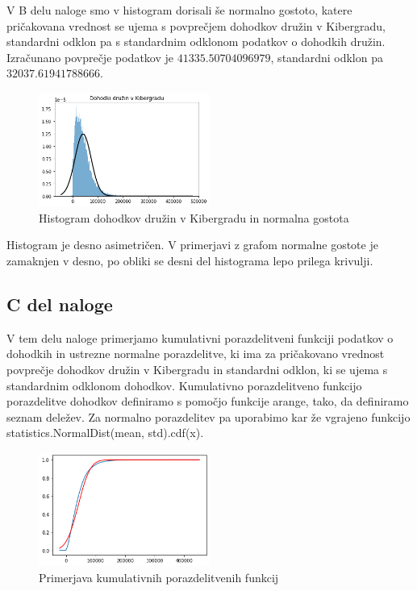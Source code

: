 \documentclass{article}
\begin{document}
V B delu naloge smo v histogram dorisali še normalno gostoto, katere pričakovana vrednost se ujema s povprečjem
dohodkov družin v Kibergradu, standardni odklon pa s standardnim odklonom podatkov o dohodkih družin.
Izračunano povprečje podatkov je $41335.50704096979$, standardni odklon pa $32037.61941788666$.

\begin{figure}[H]
    \begin{center}
        \includegraphics*[width=0.5\textwidth]{figure1B.png}
        \caption{Histogram dohodkov družin v Kibergradu in normalna gostota}
        \label{hist_in_normalna}
    \end{center}
\end{figure}

Histogram je desno asimetričen. V primerjavi z grafom normalne gostote je zamaknjen v desno, 
po obliki se desni del histograma lepo prilega krivulji.

\subsection{C del naloge}
V tem delu naloge primerjamo kumulativni porazdelitveni funkciji podatkov o dohodkih in ustrezne normalne
porazdelitve, ki ima za pričakovano vrednost povprečje dohodkov družin v Kibergradu in standardni odklon, ki se ujema
s standardnim odklonom dohodkov. Kumulativno porazdelitveno funkcijo porazdelitve dohodkov definiramo s pomočjo
funkcije arange, tako, da definiramo seznam deležev. Za normalno porazdelitev pa uporabimo kar že vgrajeno funkcijo
statistics.NormalDist(mean, std).cdf(x).
\begin{figure}[H]
    \begin{center}
        \includegraphics*[width=0.5\textwidth]{figure1C.png}
        \caption{Primerjava kumulativnih porazdelitvenih funkcij}
        \label{kumulativne}
    \end{center}
\end{figure}
\end{document}

